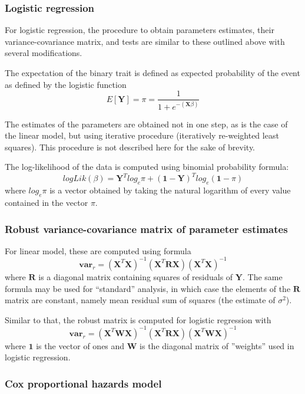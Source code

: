 \documentclass[12pt,a4paper]{article}
\begin{document}
\subsubsection{Logistic regression}

For logistic regression, the procedure to obtain 
parameters estimates, their variance-covariance matrix, and tests are 
similar to these outlined above with several modifications. 

The expectation of the binary trait is defined as expected 
probability of the event as defined by the logistic 
function 
$$
E[\mathbf{Y}] = \pi = \frac{ 1 }{ 1 + e^{-(\mathbf{X}\beta)} }
$$

The estimates of the parameters are obtained not in one 
step, as is the case of the linear model, but using iterative 
procedure (iteratively re-weighted least squares). This 
procedure is not described here for the sake of brevity. 

The log-likelihood of the data is computed using 
binomial probability formula:
$$
logLik(\beta) = \mathbf{Y}^T log_e \pi + (\mathbf{1} - \mathbf{Y})^T log_e (\mathbf{1}-\pi)
$$
where $log_e \pi$ is a vector obtained by taking the natural logarithm of every 
value contained in the vector $\pi$. 

\subsubsection{Robust variance-covariance matrix of parameter estimates}

For linear model, these are computed using formula
$$
\mathbf{var}_r = (\mathbf{X}^T\mathbf{X})^{-1} (\mathbf{X}^T\mathbf{R}\mathbf{X})
(\mathbf{X}^T\mathbf{X})^{-1}
$$
where $\mathbf{R}$ is a diagonal matrix containing squares of residuals
of $\mathbf{Y}$. The 
same formula may be used for ``standard'' analysis, in which case
the elements of the $\mathbf{R}$ matrix are constant, namely mean 
residual sum of squares (the estimate of $\sigma^2$).

Similar to that, the robust matrix is computed for logistic regression with
$$
\mathbf{var}_r = (\mathbf{X}^T \mathbf{W} \mathbf{X})^{-1} (\mathbf{X}^T\mathbf{R}\mathbf{X})
(\mathbf{X}^T \mathbf{W} \mathbf{X})^{-1}
$$
where $\mathbf{1}$ is the vector of ones and $\mathbf{W}$ is the diagonal matrix 
of ''weights'' used in logistic regression. 


\subsubsection{Cox proportional hazards model}
\end{document}
